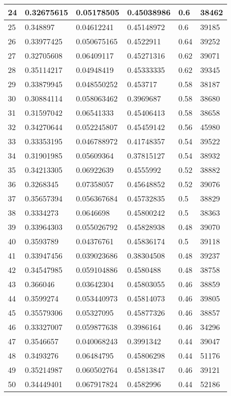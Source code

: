\begin{longtable}{|l|l|l|l|l|l|}
24 & 0.32675615 & 0.05178505 & 0.45038986 & 0.6 & 38462 \\ \hline 
25 & 0.348897 & 0.04612241 & 0.45148972 & 0.6 & 39185 \\ \hline 
26 & 0.33977425 & 0.050675165 & 0.4522911 & 0.64 & 39252 \\ \hline 
27 & 0.32705608 & 0.06409117 & 0.45271316 & 0.62 & 39071 \\ \hline 
28 & 0.35114217 & 0.04948419 & 0.45333335 & 0.62 & 39345 \\ \hline 
29 & 0.33879945 & 0.048550252 & 0.453717 & 0.58 & 38187 \\ \hline 
30 & 0.30884114 & 0.058063462 & 0.3969687 & 0.58 & 38680 \\ \hline 
31 & 0.31597042 & 0.06541333 & 0.45406413 & 0.58 & 38658 \\ \hline 
32 & 0.34270644 & 0.052245807 & 0.45459142 & 0.56 & 45980 \\ \hline 
33 & 0.33353195 & 0.046788972 & 0.41748357 & 0.54 & 39522 \\ \hline 
34 & 0.31901985 & 0.05609364 & 0.37815127 & 0.54 & 38932 \\ \hline 
35 & 0.34213305 & 0.06922639 & 0.4555992 & 0.52 & 38882 \\ \hline 
36 & 0.3268345 & 0.07358057 & 0.45648852 & 0.52 & 39076 \\ \hline 
37 & 0.35657394 & 0.056367684 & 0.45732835 & 0.5 & 38829 \\ \hline 
38 & 0.3334273 & 0.0646698 & 0.45800242 & 0.5 & 38363 \\ \hline 
39 & 0.33964303 & 0.055026792 & 0.45828938 & 0.48 & 39070 \\ \hline 
40 & 0.3593789 & 0.04376761 & 0.45836174 & 0.5 & 39118 \\ \hline 
41 & 0.33947456 & 0.039023686 & 0.38304508 & 0.48 & 39237 \\ \hline 
42 & 0.34547985 & 0.059104886 & 0.4580488 & 0.48 & 38758 \\ \hline 
43 & 0.366046 & 0.03642304 & 0.45803055 & 0.46 & 38859 \\ \hline 
44 & 0.3599274 & 0.053440973 & 0.45814073 & 0.46 & 39805 \\ \hline 
45 & 0.35579306 & 0.05327095 & 0.45877326 & 0.46 & 38857 \\ \hline 
46 & 0.33327007 & 0.059877638 & 0.3986164 & 0.46 & 34296 \\ \hline 
47 & 0.3546657 & 0.040068243 & 0.3991342 & 0.44 & 39047 \\ \hline 
48 & 0.3493276 & 0.06484795 & 0.45806298 & 0.44 & 51176 \\ \hline 
49 & 0.35214987 & 0.060502764 & 0.45813847 & 0.46 & 39121 \\ \hline 
50 & 0.34449401 & 0.067917824 & 0.4582996 & 0.44 & 52186 \\ \hline 
\end{longtable}